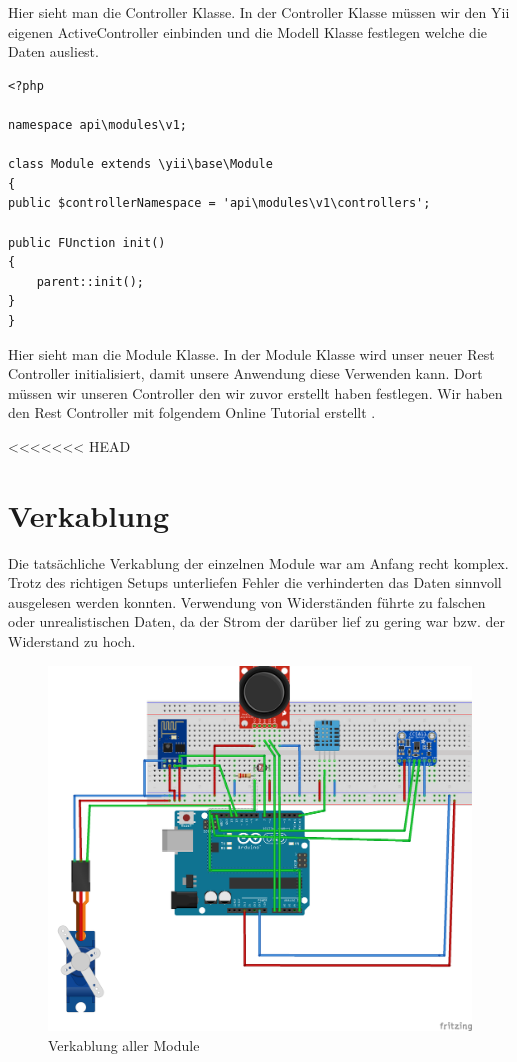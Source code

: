 Hier sieht man die Controller Klasse. In der Controller Klasse müssen wir den Yii eigenen ActiveController einbinden und die Modell Klasse festlegen welche die Daten ausliest.
\begin{lstlisting}[caption=Module Klasse für REST]
<?php

namespace api\modules\v1;

class Module extends \yii\base\Module
{
public $controllerNamespace = 'api\modules\v1\controllers';

public FUnction init()
{
	parent::init();
}
}
\end{lstlisting}
Hier sieht man die Module Klasse. In der Module Klasse wird unser neuer Rest Controller initialisiert, damit unsere Anwendung diese Verwenden kann. Dort müssen wir unseren Controller den wir zuvor erstellt haben festlegen.
\newline
Wir haben den Rest Controller mit folgendem Online Tutorial erstellt \cite{Restt}.



\newpage
<<<<<<< HEAD
\def \currentAuthor {Kevin Glatz}
\section{Verkablung}

Die tatsächliche Verkablung der einzelnen Module war am Anfang recht komplex. Trotz des richtigen Setups unterliefen Fehler die verhinderten das Daten sinnvoll ausgelesen werden konnten. Verwendung von Widerständen führte zu falschen oder unrealistischen Daten, da der Strom der darüber lief zu gering war bzw. der Widerstand zu hoch. 

\begin{figure}[h]
	\centering
	\includegraphics[width=0.7\linewidth]{figures/allMod}
	\caption{Verkablung aller Module}
	\label{fig:allmod}
\end{figure}

